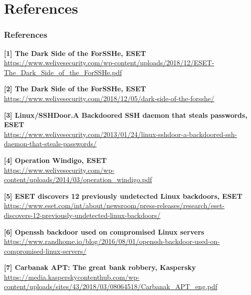 \documentclass[11pt,svgnames,smaller]{beamer}
\begin{document}
	\section{References}
	\begin{frame}
		\frametitle{References}
		
		\small
		
    \textbf{[1] The Dark Side of the ForSSHe, ESET}\\
    \phantom{[X] }\url{https://www.welivesecurity.com/wp-content/uploads/2018/12/ESET-The_Dark_Side_of_the_ForSSHe.pdf}

    \smallskip

    \textbf{[2] The Dark Side of the ForSSHe, ESET}\\
    \phantom{[X] }\url{https://www.welivesecurity.com/2018/12/05/dark-side-of-the-forsshe/}

    \smallskip

    \textbf{[3] Linux/SSHDoor.A Backdoored SSH daemon that steals passwords, ESET}\\
    \phantom{[X] }\url{https://www.welivesecurity.com/2013/01/24/linux-sshdoor-a-backdoored-ssh-daemon-that-steals-passwords/}

    \smallskip

    \textbf{[4] Operation Windigo, ESET}\\
    \phantom{[X] }\url{https://www.welivesecurity.com/wp-content/uploads/2014/03/operation_windigo.pdf}

    \smallskip

    \textbf{[5] ESET discovers 12 previously undetected Linux backdoors, ESET}\\
    \phantom{[X] }\url{https://www.eset.com/int/about/newsroom/press-releases/research/eset-discovers-12-previously-undetected-linux-backdoors/}

    \smallskip

    \textbf{[6] Openssh backdoor used on compromised Linux servers}\\
    \phantom{[X] }\url{https://www.randhome.io/blog/2016/08/01/openssh-backdoor-used-on-compromised-linux-servers/}

    \smallskip

    \textbf{[7] Carbanak APT: The great bank robbery, Kaspersky}\\
    \phantom{[X] }\url{https://media.kasperskycontenthub.com/wp-content/uploads/sites/43/2018/03/08064518/Carbanak_APT_eng.pdf}


 	\end{frame}
  
\end{document}
